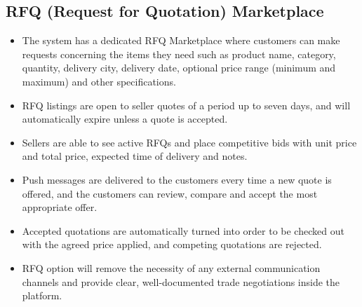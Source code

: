 \subsection{RFQ (Request for Quotation) Marketplace}
\begin{itemize}
    \item The system has a dedicated RFQ Marketplace where customers can make requests concerning the items they need such as product name, category, quantity, delivery city, delivery date, optional price range (minimum and maximum) and other specifications.
    
    \item RFQ listings are open to seller quotes of a period up to seven days, and will automatically expire unless a quote is accepted.
    
    \item Sellers are able to see active RFQs and place competitive bids with unit price and total price, expected time of delivery and notes.
    
    \item Push messages are delivered to the customers every time a new quote is offered, and the customers can review, compare and accept the most appropriate offer.
    
    \item Accepted quotations are automatically turned into order to be checked out with the agreed price applied, and competing quotations are rejected.
    
    \item RFQ option will remove the necessity of any external communication channels and provide clear, well-documented trade negotiations inside the platform.
\end{itemize}

